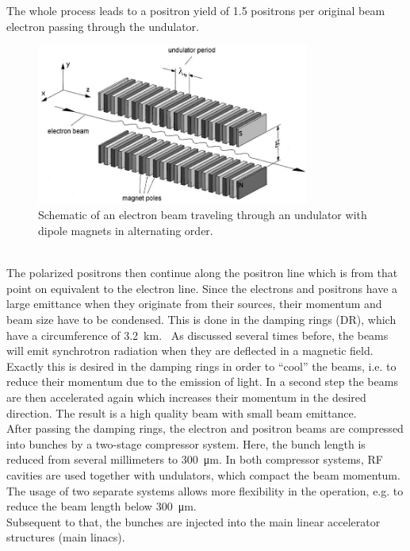 The whole process leads to a positron yield of 1.5 positrons per original beam electron passing through the undulator.~\cite{Ushakov}
\begin{figure}
\centering
\includegraphics[width=0.8\textwidth]{Figures/Undulator_edited.png}
\caption[Schematic layout of an undulator]{Schematic of an electron beam traveling through an undulator with dipole magnets in alternating order.~\cite[based on p. 41]{Wille}}
\label{fig:Undulator}
\end{figure}
\\The polarized positrons then continue along the positron line which is from that point on equivalent to the electron line.
Since the electrons and positrons have a large emittance when they originate from their sources, their momentum and beam size have to be condensed.
This is done in the damping rings (DR), which have a circumference of \SI{3.2}{\kilo\meter}.~\cite[p. 14]{TDR32}
As discussed several times before, the beams will emit synchrotron radiation when they are deflected in a magnetic field.
Exactly this is desired in the damping rings in order to ``cool'' the beams, i.e. to reduce their momentum due to the emission of light.
In a second step the beams are then accelerated again which increases their momentum in the desired direction.
The result is a high quality beam with small beam emittance.\\
After passing the damping rings, the electron and positron beams are compressed into bunches by a two-stage compressor system.
Here, the bunch length is reduced from several millimeters to \SI{300}{\micro\meter}.
In both compressor systems, RF cavities are used together with undulators, which compact the beam momentum.
The usage of two separate systems allows more flexibility in the operation, e.g. to reduce the beam length below \SI{300}{\micro\meter}.~\cite[p. 124]{TDR32}\\
Subsequent to that, the bunches are injected into the main linear accelerator structures (main linacs).

